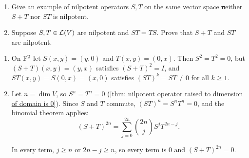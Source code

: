 \begin{xrcs}
  \begin{enumerate}
    \item Give an example of nilpotent operators $S, T$ on the same vector space \st neither $S + T$ nor $ST$ is nilpotent.
    \item Suppose $S, T \in \mathcal{L}(V)$ are nilpotent and $ST = TS$. Prove that $S + T$ and $ST$ are nilpotent.
  \end{enumerate}

\begin{xsol}
  \begin{enumerate}
    \item On $\mathbb{F}^2$ let $S(x, y) = (y, 0)$ and $T(x, y) = (0, x)$. Then $S^2 = T^2 = 0$, but $(S + T)(x, y) = (y, x)$ satisfies $(S+T)^2 = I$, and $ST(x, y) = S(0, x) = (x, 0)$ satisfies $(ST)^k = ST \neq 0$ for all $k \geq 1$.
    \item Let $n = \dim V$, so $S^n = T^n = 0$ (\ref{thm: nilpotent operator raised to dimension of domain is 0}). Since $S$ and $T$ commute, $(ST)^n = S^n T^n = 0$, and the binomial theorem applies:
    \begin{equation}
      (S + T)^{2n} = \sum_{j=0}^{2n} \binom{2n}{j} S^j T^{2n-j}.
    \end{equation}

    In every term, $j \geq n$ or $2n - j \geq n$, so every term is $0$ and $(S+T)^{2n} = 0$.
  \end{enumerate}
  \vspace{-\baselineskip}
\end{xsol}
\end{xrcs}

